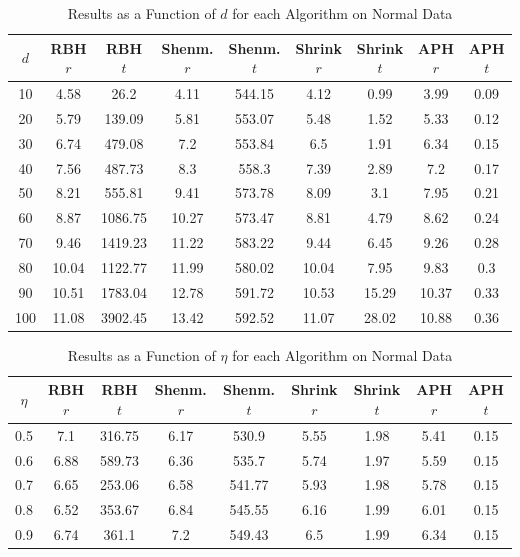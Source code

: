 \documentclass[11pt,twoside]{report}
\theoremstyle{definition}
\numberwithin{theorem}{section}
\numberwithin{definition}{section}
\numberwithin{lemma}{section}
\numberwithin{proposition}{section}
\numberwithin{equation}{section}
\numberwithin{figure}{section}
\begin{document}
\begin{appendices}
    \begin{table}[ht]
        \centering
        \begin{tabular}{|c||c|c||c|c||c|c||c|c|} \hline
            $d$&RBH $r$&RBH $t$&Shenm. $r$&Shenm. $t$&Shrink $r$&Shrink $t$&APH $r$&APH $t$ \\ \hline
            10&4.58&26.2&4.11&544.15&4.12&0.99&3.99&0.09 \\
            20&5.79&139.09&5.81&553.07&5.48&1.52&5.33&0.12 \\
            30&6.74&479.08&7.2&553.84&6.5&1.91&6.34&0.15 \\
            40&7.56&487.73&8.3&558.3&7.39&2.89&7.2&0.17 \\
            50&8.21&555.81&9.41&573.78&8.09&3.1&7.95&0.21 \\
            60&8.87&1086.75&10.27&573.47&8.81&4.79&8.62&0.24 \\
            70&9.46&1419.23&11.22&583.22&9.44&6.45&9.26&0.28 \\
            80&10.04&1122.77&11.99&580.02&10.04&7.95&9.83&0.3 \\
            90&10.51&1783.04&12.78&591.72&10.53&15.29&10.37&0.33 \\
            100&11.08&3902.45&13.42&592.52&11.07&28.02&10.88&0.36 \\ \hline
        \end{tabular}
        \caption{Results as a Function of $d$ for each Algorithm on Normal Data}
        \label{tab:normal_table_d}
    \end{table}
    
    \begin{table}[ht]
        \centering
        \begin{tabular}{|c||c|c||c|c||c|c||c|c|} \hline
            $\eta$&RBH $r$&RBH $t$&Shenm. $r$&Shenm. $t$&Shrink $r$&Shrink $t$&APH $r$&APH $t$ \\ \hline
            0.5&7.1&316.75&6.17&530.9&5.55&1.98&5.41&0.15 \\
            0.6&6.88&589.73&6.36&535.7&5.74&1.97&5.59&0.15 \\
            0.7&6.65&253.06&6.58&541.77&5.93&1.98&5.78&0.15 \\
            0.8&6.52&353.67&6.84&545.55&6.16&1.99&6.01&0.15 \\
            0.9&6.74&361.1&7.2&549.43&6.5&1.99&6.34&0.15 \\ \hline
        \end{tabular}
        \caption{Results as a Function of $\eta$ for each Algorithm on Normal Data}
        \label{tab:normal_table_eta}
    \end{table}
    \clearpage
    

\end{appendices}
\end{document}
